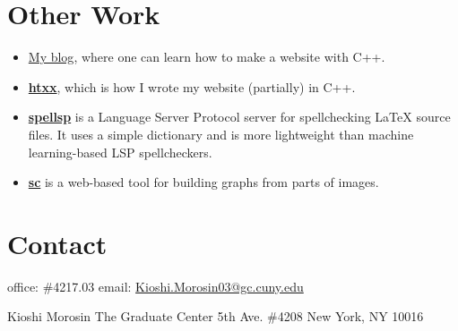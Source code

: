 \documentclass[10pt]{article}
\begin{document}
\section*{Other Work}
\begin{itemize}
    \item \href{site/}{My blog}, where one can learn how to make a website with C++.
    \item \href{https://github.com/hypertextxx/htxx}{\bfseries htxx}, which is how I wrote my website (partially) in C++.
    \item \href{https://github.com/0x277F/spelllsp}{\bfseries spellsp} is a Language Server Protocol server for spellchecking LaTeX source files. It uses a simple dictionary and is more lightweight than machine learning-based LSP spellcheckers.
    \item \href{https://seditious-conspiracy.github.io}{\bfseries sc} is a web-based tool for building graphs from parts of images.
\end{itemize}

\section*{Contact}
{\small
office: \#4217.03\newline
email: \href{mailto:Kioshi.Morosin03@gc.cuny.edu}{Kioshi.Morosin03@gc.cuny.edu}

Kioshi Morosin\newline
The Graduate Center 5th Ave. \#4208\newline
New York, NY 10016}
\end{document}
